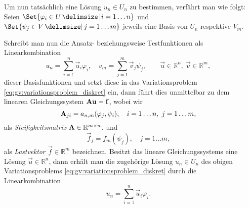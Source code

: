 Um nun tatsächlich eine Lösung $u_{n} \in U_{n}$ zu bestimmen, verfährt man wie folgt:
Seien $\Set{ \varphi_{i} \in U \given i = 1 \dots n }$ und $\Set{ \psi_{j} \in V \given j = 1 \dots m}$ jeweils eine Basis von $U_{n}$ respektive $V_{m}$.

Schreibt man nun die Ansatz- beziehungsweise Testfunktionen als Linearkombination
\begin{equation}
    u_{n} = \sum_{i = 1}^{n} \vec{u}_{i} \varphi_{i}, \quad v_{m} = \sum_{j = 1}^{m} \vec{v}_{j} \psi_{j}, \qquad \vec u \in \mathbb{R}^{n},~\vec v \in \mathbb{R}^{m},
\end{equation}
dieser Basisfunktionen und setzt diese in das Variationsproblem \cref{eq:gv:variationsproblem_diskret} ein, dann führt dies unmittelbar zu dem linearen Gleichungssystem $\mathbf{A} \mathbf{u} = \mathbf{f}$, wobei wir
\begin{equation}
    \mathbf{A}_{ji} = a_{n, m}(\varphi_{j}, \psi_{i}), \quad i = 1 \dots n,~j = 1 \dots m,
\end{equation}
als \emph{Steifigkeitsmatrix} $\mathbf{A} \in \mathbb{R}^{m \times n}$, und
\begin{equation}
    \vec f_{j} = f_{m}(\psi_{j}), \quad j = 1 \dots m,
\end{equation}
als \emph{Lastvektor} $\vec f \in \mathbb{R}^{m}$ bezeichnen.
Besitzt das lineare Gleichungssystems eine Lösung $\vec u \in \mathbb{R}^{n}$, dann erhält man die zugehörige Lösung $u_{n} \in U_{n}$ des obigen Variationsproblems \cref{eq:gv:variationsproblem_diskret} durch die Linearkombination
\begin{equation}
    u_{n} = \sum_{i = 1}^{n} \vec{u}_{i} \varphi_{i}.
\end{equation}



